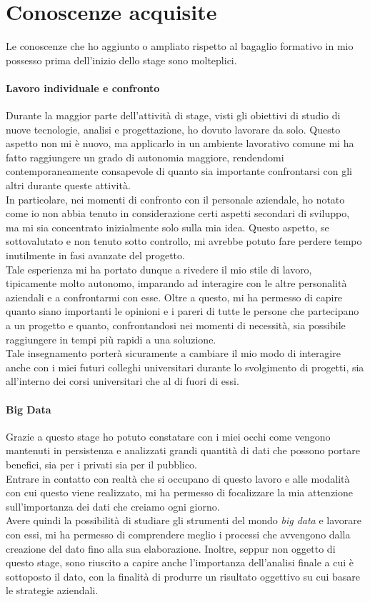 \section{Conoscenze acquisite}
Le conoscenze che ho aggiunto o ampliato rispetto al bagaglio formativo in mio possesso prima dell'inizio dello stage sono molteplici.

\paragraph{Lavoro individuale e confronto}
Durante la maggior parte dell'attività di stage, visti gli obiettivi di studio di nuove tecnologie, analisi e progettazione, ho dovuto lavorare da solo. Questo aspetto non mi è nuovo, ma applicarlo in un ambiente lavorativo comune mi ha fatto raggiungere un grado di autonomia maggiore, rendendomi contemporaneamente consapevole di quanto sia importante confrontarsi con gli altri durante queste attività. \\
In particolare, nei momenti di confronto con il personale aziendale, ho notato come io non abbia tenuto in considerazione certi aspetti secondari di sviluppo, ma mi sia concentrato inizialmente solo sulla mia idea. Questo aspetto, se sottovalutato e non tenuto sotto controllo, mi avrebbe potuto fare perdere tempo inutilmente in fasi avanzate del progetto.\\
Tale esperienza mi ha portato dunque a rivedere il mio stile di lavoro, tipicamente molto autonomo, imparando ad interagire con le altre personalità aziendali e a confrontarmi con esse. Oltre a questo, mi ha permesso di capire quanto siano importanti le opinioni e i pareri di tutte le persone che partecipano a un progetto e quanto, confrontandosi nei momenti di necessità, sia possibile raggiungere in tempi più rapidi a una soluzione. \\
Tale insegnamento porterà sicuramente a cambiare il mio modo di interagire anche con i miei futuri colleghi universitari durante lo svolgimento di progetti, sia all'interno dei corsi universitari che al di fuori di essi.

\paragraph{Big Data}
Grazie a questo stage ho potuto constatare con i miei occhi come vengono mantenuti in persistenza e analizzati grandi quantità di dati che possono portare benefici, sia per i privati sia per il pubblico. \\
Entrare in contatto con realtà che si occupano di questo lavoro e alle modalità con cui questo viene realizzato, mi ha permesso di focalizzare la mia attenzione sull'importanza dei dati che creiamo ogni giorno. \\
Avere quindi la possibilità di studiare gli strumenti del mondo \textit{big data} e lavorare con essi, mi ha permesso di comprendere meglio i processi che avvengono dalla creazione del dato fino alla sua elaborazione. Inoltre, seppur non oggetto di questo stage, sono riuscito a capire anche l'importanza dell'analisi finale a cui è sottoposto il dato, con la finalità di produrre un risultato oggettivo su cui basare le strategie aziendali.  


